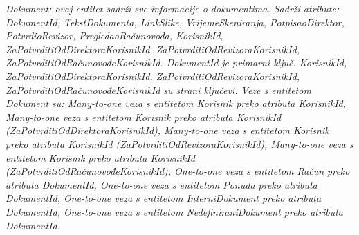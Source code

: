 				\textit{Dokument: ovaj entitet sadrži sve informacije o dokumentima. Sadrži atribute: DokumentId, TekstDokumenta, LinkSlike, VrijemeSkeniranja, PotpisaoDirektor, PotvrdioRevizor, PregledaoRačunovođa, KorisnikId, ZaPotvrditiOdDirektoraKorisnikId, ZaPotvrditiOdRevizoraKorisnikId, ZaPotvrditiOdRačunovođeKorisnikId. DokumentId je primarni ključ. KorisnikId, ZaPotvrditiOdDirektoraKorisnikId, ZaPotvrditiOdRevizoraKorisnikId, ZaPotvrditiOdRačunovođeKorisnikId su strani ključevi.
				Veze s entitetom Dokument su: Many-to-one veza s entitetom Korisnik preko atributa KorisnikId,
				Many-to-one veza s entitetom Korisnik preko atributa KorisnikId (ZaPotvrditiOdDirektoraKorisnikId),
				Many-to-one veza s entitetom Korisnik preko atributa KorisnikId (ZaPotvrditiOdRevizoraKorisnikId),
				Many-to-one veza s entitetom Korisnik preko atributa KorisnikId (ZaPotvrditiOdRačunovođeKorisnikId),
				One-to-one veza s entitetom Račun preko atributa DokumentId,
				One-to-one veza s entitetom Ponuda preko atributa DokumentId,
				One-to-one veza s entitetom InterniDokument preko atributa DokumentId,
				One-to-one veza s entitetom NedefiniraniDokument preko atributa DokumentId.}
				
